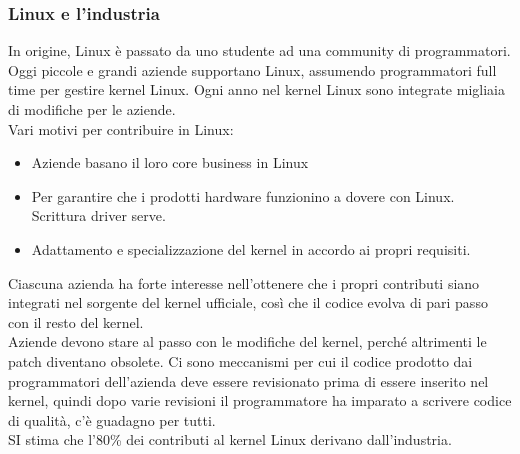 \documentclass{article}
\begin{document}
\subsubsection{Linux e l'industria}
In origine, Linux è passato da uno studente ad una community di programmatori. Oggi piccole e grandi aziende supportano Linux, assumendo programmatori full time per gestire kernel Linux. Ogni anno nel kernel Linux sono integrate migliaia di modifiche per le aziende.\\ Vari motivi per contribuire in Linux:
\begin{itemize}
\item Aziende basano il loro core business in Linux
\item Per garantire che i prodotti hardware funzionino a dovere con Linux. Scrittura driver serve.
\item Adattamento e specializzazione del kernel in accordo ai propri requisiti.
\end{itemize}
Ciascuna azienda ha forte interesse nell'ottenere che i propri contributi siano integrati nel sorgente del kernel ufficiale, così che il codice evolva di pari passo con il resto del kernel.\\ Aziende devono stare al passo con le modifiche del kernel, perché altrimenti le patch diventano obsolete. Ci sono meccanismi per cui il codice prodotto dai programmatori dell'azienda deve essere revisionato prima di essere inserito nel kernel, quindi dopo varie revisioni il programmatore ha imparato a scrivere codice di qualità, c'è guadagno per tutti.\\ SI stima che l'80\% dei contributi al kernel Linux derivano dall'industria.
\end{document}
